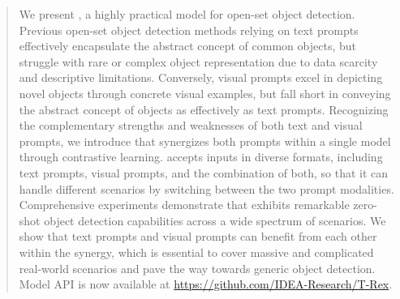\begin{abstract}
We present \ourmodel{}, a highly practical model for open-set object detection. Previous open-set object detection methods relying on text prompts effectively encapsulate the abstract concept of common objects, but struggle with rare or complex object representation due to data scarcity and descriptive limitations. Conversely, visual prompts excel in depicting novel objects through concrete visual examples, but fall short in conveying the abstract concept of objects as effectively as text prompts. Recognizing the complementary strengths and weaknesses of both text and visual prompts, we introduce \ourmodel{} that synergizes both prompts within a single model through contrastive learning. \ourmodel{} accepts inputs in diverse formats, including text prompts, visual prompts, and the combination of both, so that it can handle different scenarios by switching between the two prompt modalities. Comprehensive experiments demonstrate that \ourmodel{} exhibits remarkable zero-shot object detection capabilities across a wide spectrum of scenarios. We show that text prompts and visual prompts can benefit from each other within the synergy, which is essential to cover massive and complicated real-world scenarios and pave the way towards generic object detection. Model API is now available at \url{https://github.com/IDEA-Research/T-Rex}.

\end{abstract}